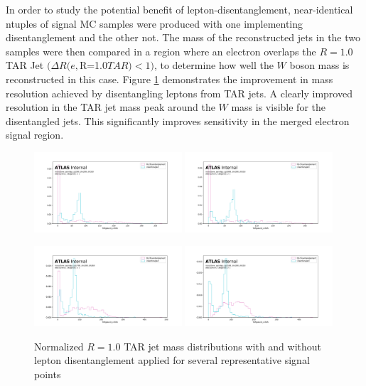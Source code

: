 In order to study the potential benefit of lepton-disentanglement, near-identical ntuples of signal MC samples were produced with one implementing disentanglement and the other not.
The mass of the reconstructed jets in the two samples were then compared in a region where an electron overlaps the $R=1.0$ TAR Jet $(\Delta R(e, $R=1.0$ TAR) < 1)$, to determine how well the $W$ boson mass is reconstructed in this case.
Figure \ref{fig:TARdisentaglementplots} demonstrates the improvement in mass resolution achieved by disentangling leptons from TAR jets. A clearly improved resolution in the TAR jet mass peak around the $W$ mass is visible for the disentangled jets. This significantly improves sensitivity in the merged electron signal region.

\begin{figure}[!h]
\centering
   \includegraphics[width = 0.49\textwidth]{figures/4/TAR/monoSww_semilep_zp500_dm200_dh310.png}
   \includegraphics[width = 0.49\textwidth]{figures/4/TAR/monoSww_semilep_zp1000_dm200_dh310.png}

   \includegraphics[width = 0.49\textwidth]{figures/4/TAR/monoSww_semilep_zp1700_dm200_dh260.png}
   \includegraphics[width = 0.49\textwidth]{figures/4/TAR/monoSww_semilep_zp2100_dm200_dh210.png}

   \caption{Normalized $R=1.0$ TAR jet mass distributions with and without lepton disentanglement applied for several representative signal points}
   \label{fig:TARdisentaglementplots}
\end{figure}



